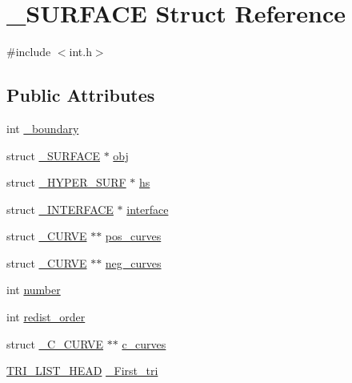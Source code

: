 \hypertarget{struct___s_u_r_f_a_c_e}{}\section{\+\_\+\+S\+U\+R\+F\+A\+CE Struct Reference}
\label{struct___s_u_r_f_a_c_e}


{\ttfamily \#include $<$int.\+h$>$}

\subsection*{Public Attributes}
\begin{DoxyCompactItemize}
\item 
int \hyperlink{struct___s_u_r_f_a_c_e_a11de8423c72782215de12f7e9c3f441c}{\+\_\+boundary}
\item 
struct \hyperlink{struct___s_u_r_f_a_c_e}{\+\_\+\+S\+U\+R\+F\+A\+CE} $\ast$ \hyperlink{struct___s_u_r_f_a_c_e_a47d23768381c84367d4fee3ca0b70e33}{obj}
\item 
struct \hyperlink{int_8h_dd/d7d/struct___h_y_p_e_r___s_u_r_f}{\+\_\+\+H\+Y\+P\+E\+R\+\_\+\+S\+U\+RF} $\ast$ \hyperlink{struct___s_u_r_f_a_c_e_a3ae73977f2e502d568454426256042c8}{hs}
\item 
struct \hyperlink{int_8h_d0/d95/struct___i_n_t_e_r_f_a_c_e}{\+\_\+\+I\+N\+T\+E\+R\+F\+A\+CE} $\ast$ \hyperlink{struct___s_u_r_f_a_c_e_a8517f491528416bfe2d265a30ec45e7a}{interface}
\item 
struct \hyperlink{struct___c_u_r_v_e}{\+\_\+\+C\+U\+R\+VE} $\ast$$\ast$ \hyperlink{struct___s_u_r_f_a_c_e_ab5d92b2042886a759622f98c26eed7e6}{pos\+\_\+curves}
\item 
struct \hyperlink{struct___c_u_r_v_e}{\+\_\+\+C\+U\+R\+VE} $\ast$$\ast$ \hyperlink{struct___s_u_r_f_a_c_e_a437849be2079884d6b490cb526286900}{neg\+\_\+curves}
\item 
int \hyperlink{struct___s_u_r_f_a_c_e_a595c21bd29bc73787a0d40dce34cfbd8}{number}
\item 
int \hyperlink{struct___s_u_r_f_a_c_e_a817d62df07aad43cff04d9d9e6093f11}{redist\+\_\+order}
\item 
struct \hyperlink{int_8h_da/dc6/struct___c___c_u_r_v_e}{\+\_\+\+C\+\_\+\+C\+U\+R\+VE} $\ast$$\ast$ \hyperlink{struct___s_u_r_f_a_c_e_a1287add2f3524e120e501778b530b7ed}{c\+\_\+curves}
\item 
\hyperlink{int_8h_d1/d45/struct_t_r_i___l_i_s_t___h_e_a_d}{T\+R\+I\+\_\+\+L\+I\+S\+T\+\_\+\+H\+E\+AD} \hyperlink{struct___s_u_r_f_a_c_e_a1f279f9ec83c7be14c823a1adbf0d839}{\+\_\+\+First\+\_\+tri}
$$
\end{DoxyCompactItemize}
